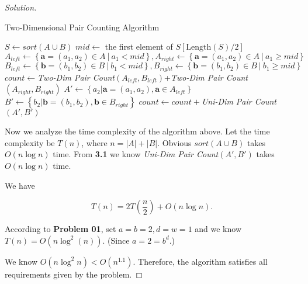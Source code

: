 \documentclass{article}
\newenvironment{solution}{\begin{proof}[\noindent\it Solution]}{\end{proof}}
\begin{document}
\begin{solution}
     \begin{algorithm}
        \caption{Two-Dimensional Pair Counting Algorithm}
        
	    {
	        \BlankLine
	        \BlankLine
	        \BlankLine
	        $S \gets sort\left(A\cup B\right)$\;
	        $mid \gets$ the first element of $S[\mathrm{Length}(S)/2]$\;
	        $A_{left}\gets\left\{\boldsymbol{a}=(a_1,a_2)\in A\ \big|\ a_1<mid\right\}, A_{right}\gets\left\{\boldsymbol{a}=(a_1,a_2)\in A\ \big|\ a_1\geq mid\right\}$\;
	        $B_{left}\gets\left\{\boldsymbol{b}=(b_1,b_2)\in B\ \big|\ b_1<mid\right\},
	        B_{right}\gets\left\{\boldsymbol{b}=(b_1,b_2)\in B\ \big|\ b_1\geq mid\right\}$\;
	        \BlankLine
	        \BlankLine
	        \BlankLine
	        $count\gets$\textit{Two-Dim Pair Count}$(A_{left},B_{left})$+\textit{Two-Dim Pair Count}$(A_{right},B_{right})$\;
	        $A'\gets\left\{a_2\big|\boldsymbol{a}=(a_1,a_2),\boldsymbol{a}\in A_{left}\right\}$\; $B'\gets\left\{b_2\big|\boldsymbol{b}=(b_1,b_2),\boldsymbol{b}\in B_{right}\right\}$\;
	        $count\gets count+$\textit{Uni-Dim Pair Count}$(A',B')$\;
	    }
    \end{algorithm}
    
    \hspace{2.5em}
    Now we analyze the time complexity of the algorithm above. Let the time complexity be $T(n)$, where $n=|A|+|B|$. Obvious $sort(A\cup B)$ takes $O(n\log n)$ time. From \textbf{3.1} we know \textit{Uni-Dim Pair Count}$(A',B')$ takes $O(n\log n)$ time.
    
    \hspace{2.5em}
    We have
    
    \vspace{-1.5em}
    $$T(n) = 2T\left(\frac{n}{2}\right)+O(n\log n).$$
    
    \hspace{2.5em}
    According to \textbf{Problem 01}, set $a=b=2, d=w=1$ and we know $T(n)=O\left(n\log^2(n)\right)$. (Since $a=2=b^d$.)
    
    \hspace{2.5em}
    We know $O(n\log^2n)<O(n^{1.1}).$ Therefore, the algorithm satisfies all requirements given by the problem.
\end{solution}
\end{document}
